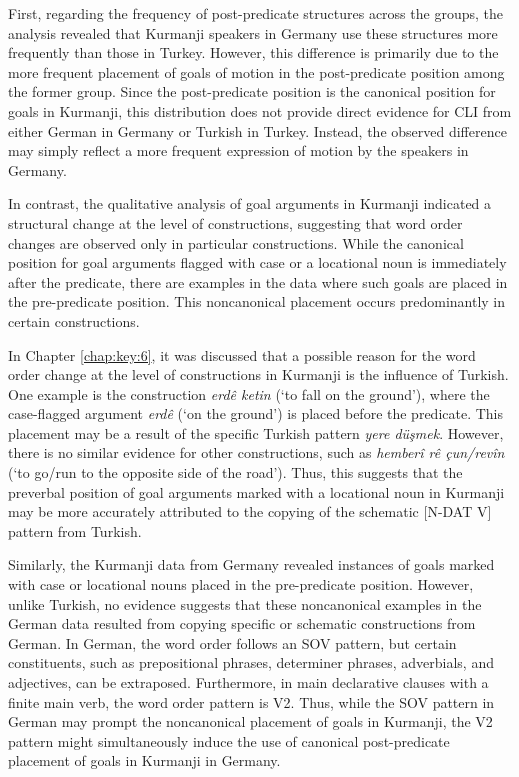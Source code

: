 \largerpage
First, regarding the frequency of post-predicate structures across the groups, the analysis revealed that Kurmanji speakers in Germany use these structures more frequently than those in Turkey. However, this difference is primarily due to the more frequent placement of goals of motion in the post-predicate position among the former group. Since the post-predicate position is the canonical position for goals in Kurmanji, this distribution does not provide direct evidence for CLI from either German in Germany or Turkish in Turkey. Instead, the observed difference may simply reflect a more frequent expression of motion by the speakers in Germany.

In contrast, the qualitative analysis of goal arguments in Kurmanji indicated a structural change at the level of constructions, suggesting that word order changes are observed only in particular constructions. While the canonical position for goal arguments flagged with case or a locational noun is immediately after the predicate, there are examples in the data where such goals are placed in the pre-predicate position. This noncanonical placement occurs predominantly in certain constructions.

In Chapter \ref{chap:key:6}, it was discussed that a possible reason for the word order change at the level of constructions in Kurmanji is the influence of Turkish. One example is the construction \textit{erdê ketin} (‘to fall on the ground’), where the case-flagged argument \textit{erdê} (‘on the ground’) is placed before the predicate. This placement may be a result of the specific Turkish pattern \textit{yere düşmek}. However, there is no similar evidence for other constructions, such as \textit{hemberî rê çun/revîn} (‘to go/run to the opposite side of the road’). Thus, this suggests that the preverbal position of goal arguments marked with a locational noun in Kurmanji may be more accurately attributed to the copying of the schematic [N-DAT V] pattern from Turkish.

Similarly, the Kurmanji data from Germany revealed instances of goals marked with case or locational nouns placed in the pre-predicate position. However, unlike Turkish, no evidence suggests that these noncanonical examples in the German data resulted from copying specific or schematic constructions from German. In German, the word order follows an SOV pattern, but certain constituents, such as prepositional phrases, determiner phrases, adverbials, and adjectives, can be extraposed. Furthermore, in main declarative clauses with a finite main verb, the word order pattern is V2. Thus, while the SOV pattern in German may prompt the noncanonical placement of goals in Kurmanji, the V2 pattern might simultaneously induce the use of canonical post-predicate placement of goals in Kurmanji in Germany.

